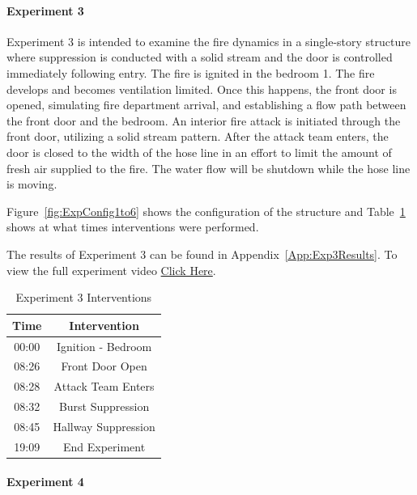 \documentclass[12pt,oneside]{book}
\begin{document}
\clearpage

\paragraph{Experiment 3} \mbox{}

Experiment 3 is intended to examine the fire dynamics in a single-story structure where suppression is conducted with a solid stream and the door is controlled immediately following entry. The fire is ignited in the bedroom 1. The fire develops and becomes ventilation limited. Once this happens, the front door is opened, simulating fire department arrival, and establishing a flow path between the front door and the bedroom. An interior fire attack is initiated through the front door, utilizing a solid stream pattern. After the attack team enters, the door is closed to the width of the hose line in an effort to limit the amount of fresh air supplied to the fire. The water flow will be shutdown while the hose line is moving.

Figure~\ref{fig:ExpConfig1to6} shows the configuration of the structure and Table~\ref{Table:Exp3Interventions} shows at what times interventions were performed. 

The results of Experiment 3 can be found in Appendix~\ref{App:Exp3Results}. To view the full experiment video \href{https://youtu.be/gl8rc1Nsl1k}{Click Here}.

\begin{table}[H]
	\centering
	\caption{Experiment 3 Interventions}
	\begin{tabular}{|c|c|} 
		\hline
		Time & Intervention \\ \hline \hline
		00:00 & Ignition - Bedroom \\ \hline
		08:26 & Front Door Open \\ \hline
		08:28 & Attack Team Enters\\ \hline
		08:32 & Burst Suppression \\ \hline 
		08:45 & Hallway Suppression \\ \hline
		19:09 & End Experiment\\ \hline
	\end{tabular}
	\label{Table:Exp3Interventions}
\end{table}

\clearpage

\paragraph{Experiment 4} \mbox{}
\end{document}
